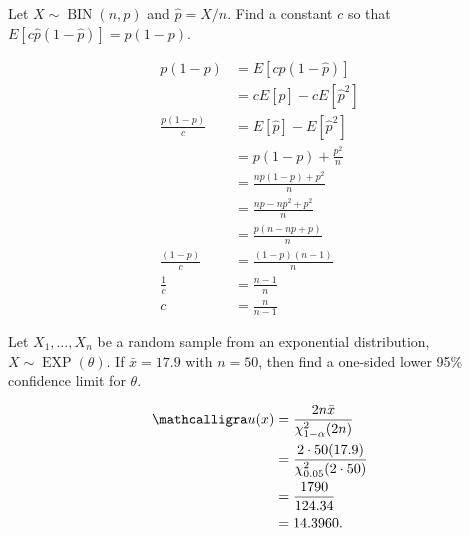 \documentclass[answers]{exam}
\begin{document}
\begin{questions}
\question 
Let \(X\sim\operatorname{BIN}(n,p)\) and \(\hat{p}=X/n\).
Find a constant \(c\) so that
\(E\left[c\hat{p}(1-\hat{p})\right]=p(1-p)\).
\begin{solution}
	\begin{align*}
		p(1-p) &= E[c\hat{p}(1-\hat{p})] \\
		&= cE[\hat{p}]-cE[\hat{p}^2] \\
		\frac{p(1-p)}{c} &= E[\hat{p}]-E[\hat{p}^2] \\
		&= p(1-p)+\frac{p^2}{n} \\
		&= \frac{np(1-p)+p^2}{n} \\
		&= \frac{np-np^2+p^2}{n} \\
		&= \frac{p(n-np+p)}{n} \\
		\frac{(1-p)}{c} &= \frac{(1-p)(n-1)}{n} \\
		\frac{1}{c} &= \frac{n-1}{n} \\
		c &= \frac{n}{n-1}
	\end{align*}
\end{solution}

\question 
Let \(X_1,\ldots,X_n\) be a random sample from an exponential distribution,
\(X\sim\operatorname{EXP}(\theta)\). 
If \(\bar{x}=17.9\) with \(n=50\), then find a one-sided lower 95\%
confidence limit for \(\theta\).
\begin{solution}
	\begin{align*}
		\mathcalligra u(x)
		&= \frac{2n\bar{x}}{\chi^2_{1-\alpha}(2n)} \\
		&= \frac{2\cdot50(17.9)}{\chi^2_{0.05}(2\cdot50)} \\
		&= \frac{1790}{124.34} \\
		&= 14.3960.
	\end{align*}
\end{solution}


\end{questions}
\end{document}

